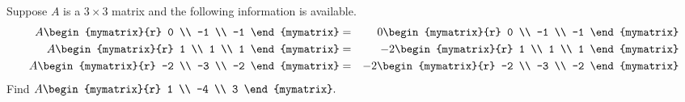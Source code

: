 \begin{enumialphparenastyle}
\begin{ex} Suppose $A$ is a $3\times 3$ matrix and the following information is
available. 
\begin{eqnarray*}
A\begin{mymatrix}{r}
0 \\
-1 \\
-1
\end{mymatrix} &=&0\begin{mymatrix}{r}
0 \\
-1 \\
-1
\end{mymatrix} \\
A\begin{mymatrix}{r}
1 \\
1 \\
1
\end{mymatrix} &=&-2\begin{mymatrix}{r}
1 \\
1 \\
1
\end{mymatrix} \\
A\begin{mymatrix}{r}
-2 \\
-3 \\
-2
\end{mymatrix} &=&-2\begin{mymatrix}{r}
-2 \\
-3 \\
-2
\end{mymatrix}
\end{eqnarray*}
Find $A\begin{mymatrix}{r}
1 \\
-4 \\
3
\end{mymatrix}. $
\end{ex}


\end{enumialphparenastyle}
